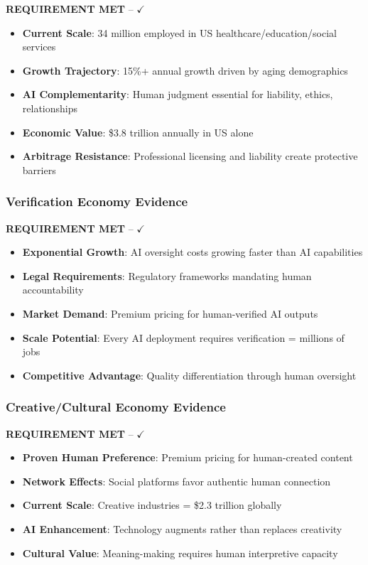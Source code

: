\documentclass[11pt,a4paper]{article}
\newcommand{\greencheckmark}{{\color{validationgreen}\textbf{$\checkmark$}}}
\newcommand{\evidence}[1]{\textcolor{validationgreen}{\textbf{#1}}}
\begin{document}
\evidence{REQUIREMENT MET} -- \greencheckmark

\begin{itemize}[leftmargin=*]
\item \textbf{Current Scale}: 34 million employed in US healthcare/education/social services
\item \textbf{Growth Trajectory}: 15\%+ annual growth driven by aging demographics  
\item \textbf{AI Complementarity}: Human judgment essential for liability, ethics, relationships
\item \textbf{Economic Value}: \$3.8 trillion annually in US alone
\item \textbf{Arbitrage Resistance}: Professional licensing and liability create protective barriers
\end{itemize}

\subsubsection{Verification Economy Evidence}

\evidence{REQUIREMENT MET} -- \greencheckmark

\begin{itemize}[leftmargin=*]
\item \textbf{Exponential Growth}: AI oversight costs growing faster than AI capabilities
\item \textbf{Legal Requirements}: Regulatory frameworks mandating human accountability
\item \textbf{Market Demand}: Premium pricing for human-verified AI outputs
\item \textbf{Scale Potential}: Every AI deployment requires verification = millions of jobs
\item \textbf{Competitive Advantage}: Quality differentiation through human oversight
\end{itemize}

\subsubsection{Creative/Cultural Economy Evidence}

\evidence{REQUIREMENT MET} -- \greencheckmark

\begin{itemize}[leftmargin=*]
\item \textbf{Proven Human Preference}: Premium pricing for human-created content
\item \textbf{Network Effects}: Social platforms favor authentic human connection
\item \textbf{Current Scale}: Creative industries = \$2.3 trillion globally
\item \textbf{AI Enhancement}: Technology augments rather than replaces creativity
\item \textbf{Cultural Value}: Meaning-making requires human interpretive capacity
\end{itemize}
\end{document}

